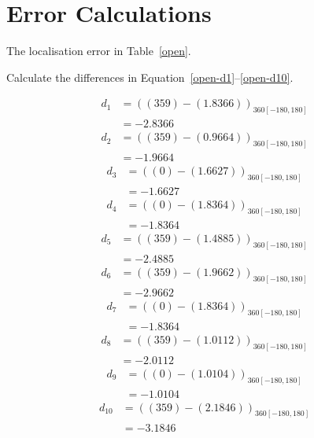 \documentclass[twocolumn]{article}
\begin{document}
\section{Error Calculations}

The localisation error in Table~\ref{open}.\cite{alexneil4}

Calculate the differences in Equation~\ref{open-d1}--\ref{open-d10}.

\begin{align}
d_{1} &= ((359) - (1.8366))_{360[-180,180]} \nonumber\\
 &= -2.8366 \label{open-d1}
\end{align}
\begin{align}
d_{2} &= ((359) - (0.9664))_{360[-180,180]} \nonumber\\
 &= -1.9664 \label{open-d2}
\end{align}
\begin{align}
d_{3} &= ((0) - (1.6627))_{360[-180,180]} \nonumber\\
 &= -1.6627 \label{open-d3}
\end{align}
\begin{align}
d_{4} &= ((0) - (1.8364))_{360[-180,180]} \nonumber\\
 &= -1.8364 \label{open-d4}
\end{align}
\begin{align}
d_{5} &= ((359) - (1.4885))_{360[-180,180]} \nonumber\\
 &= -2.4885 \label{open-d5}
\end{align}
\begin{align}
d_{6} &= ((359) - (1.9662))_{360[-180,180]} \nonumber\\
 &= -2.9662 \label{open-d6}
\end{align}
\begin{align}
d_{7} &= ((0) - (1.8364))_{360[-180,180]} \nonumber\\
 &= -1.8364 \label{open-d7}
\end{align}
\begin{align}
d_{8} &= ((359) - (1.0112))_{360[-180,180]} \nonumber\\
 &= -2.0112 \label{open-d8}
\end{align}
\begin{align}
d_{9} &= ((0) - (1.0104))_{360[-180,180]} \nonumber\\
 &= -1.0104 \label{open-d9}
\end{align}
\begin{align}
d_{10} &= ((359) - (2.1846))_{360[-180,180]} \nonumber\\
 &= -3.1846 \label{open-d10}
\end{align}
\end{document}

